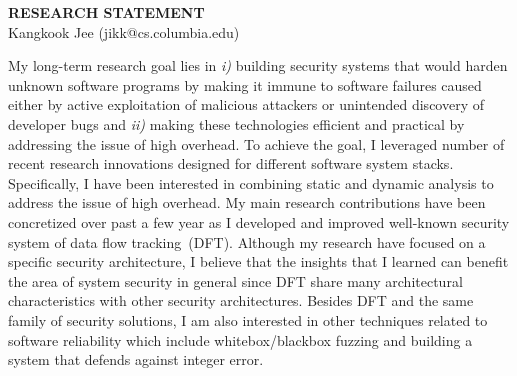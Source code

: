 \documentclass[letterpaper, 10pt]{article}
\begin{document}
\begin{small}

\begin{center}
{\LARGE \bf RESEARCH STATEMENT}\\
\vspace*{0.1cm}
{\normalsize Kangkook Jee (jikk@cs.columbia.edu)}
\end{center}



My long-term research goal lies in {\it i)} building security systems that
would harden unknown software programs by making it immune to software failures
caused either by active exploitation of malicious attackers or unintended
discovery of developer bugs and {\it ii)} making these technologies efficient
and practical by addressing the issue of high overhead.
%
To achieve the goal, I leveraged number of recent research innovations designed
for different software system stacks. Specifically, I have been interested in
combining static and dynamic analysis to address the issue of high overhead.
%
My main research contributions have been concretized over past a few year as I
developed and improved well-known security system of data flow tracking~(DFT).
Although my research have focused on a specific security architecture, I
believe that the insights that I learned can benefit the area of system
security in general since DFT share many architectural characteristics with
other security architectures.
%
Besides DFT and the same family of security solutions, I am also interested in
other techniques related to software reliability which include
whitebox/blackbox fuzzing and building a system that defends against integer
error.


\end{small}
\end{document}
